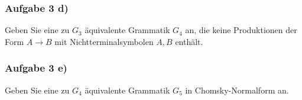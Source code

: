 \subsubsection{Aufgabe 3 d)}
Geben Sie eine zu $G_3$ äquivalente Grammatik $G_4$ an, die keine Produktionen der Form $A\to B$ mit Nichtterminalsymbolen $A,B$ enthält.

\begin{lösung}
\end{lösung}

\subsubsection{Aufgabe 3 e)}
Geben Sie eine zu $G_4$ äquivalente Grammatik $G_5$ in Chomsky-Normalform an.

\begin{lösung}
\end{lösung}